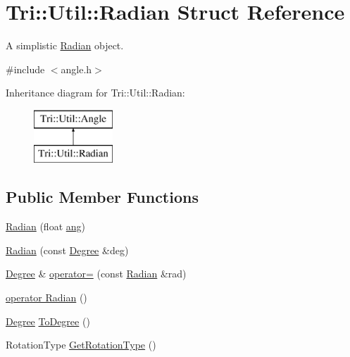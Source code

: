 \hypertarget{struct_tri_1_1_util_1_1_radian}{}\section{Tri\+:\+:Util\+:\+:Radian Struct Reference}
\label{struct_tri_1_1_util_1_1_radian}


A simplistic \hyperlink{struct_tri_1_1_util_1_1_radian}{Radian} object.  




{\ttfamily \#include $<$angle.\+h$>$}

Inheritance diagram for Tri\+:\+:Util\+:\+:Radian\+:\begin{figure}[H]
\begin{center}
\leavevmode
\includegraphics[height=2.000000cm]{struct_tri_1_1_util_1_1_radian}
\end{center}
\end{figure}
\subsection*{Public Member Functions}
\begin{DoxyCompactItemize}
\item 
\hyperlink{struct_tri_1_1_util_1_1_radian_a27399cf06cb95120b14ee235af2f335e}{Radian} (float \hyperlink{struct_tri_1_1_util_1_1_angle_a38c78e367d283762e443cc630c021a0d}{ang})
\item 
\hyperlink{struct_tri_1_1_util_1_1_radian_aea3879a3dffa97026a431382946fee4c}{Radian} (const \hyperlink{struct_tri_1_1_util_1_1_degree}{Degree} \&deg)
\item 
\hyperlink{struct_tri_1_1_util_1_1_degree}{Degree} \& \hyperlink{struct_tri_1_1_util_1_1_radian_a3055db130893a67200fe2f70c53a87a2}{operator=} (const \hyperlink{struct_tri_1_1_util_1_1_radian}{Radian} \&rad)
\item 
\hyperlink{struct_tri_1_1_util_1_1_radian_a13984716cc64213b7b7d1303d1b81ab9}{operator Radian} ()
\item 
\hyperlink{struct_tri_1_1_util_1_1_degree}{Degree} \hyperlink{struct_tri_1_1_util_1_1_radian_a4dad8b79e56d5a8f06e2457d1af46635}{To\+Degree} ()
\item 
Rotation\+Type \hyperlink{struct_tri_1_1_util_1_1_radian_a5085362c44f009ebfe4ca5f91b3137e2}{Get\+Rotation\+Type} ()
\end{DoxyCompactItemize}
